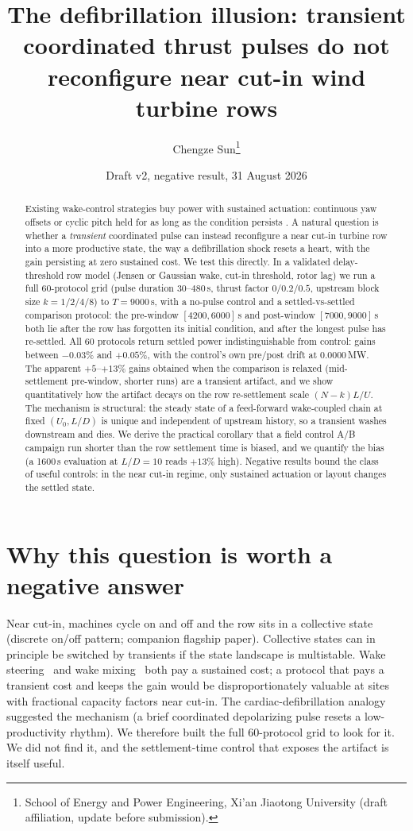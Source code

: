 \documentclass[11pt]{article}
\title{The defibrillation illusion: transient coordinated thrust pulses
do not reconfigure near cut-in wind turbine rows}
\author{Chengze Sun\thanks{School of Energy and Power Engineering, Xi'an Jiaotong University (draft affiliation, update before submission).}}
\date{Draft v2, negative result, 31 August 2026}
\begin{document}
\maketitle

\begin{abstract}
Existing wake-control strategies buy power with sustained actuation: continuous yaw offsets
or cyclic pitch held for as long as the condition persists
\cite{Howland2019,Korb2020,VanVondelen2024}. A natural question is whether a \emph{transient}
coordinated pulse can instead reconfigure a near cut-in turbine row into a more productive
state, the way a defibrillation shock resets a heart, with the gain persisting at zero
sustained cost. We test this directly. In a validated delay-threshold row model (Jensen or
Gaussian wake, cut-in threshold, rotor lag) we run a full 60-protocol grid (pulse duration
$30$--$480$\,s, thrust factor $0/0.2/0.5$, upstream block size $k=1/2/4/8$) to $T=9000$\,s,
with a no-pulse control and a settled-vs-settled comparison protocol: the pre-window
$[4200,6000]$\,s and post-window $[7000,9000]$\,s both lie after the row has forgotten its
initial condition, and after the longest pulse has re-settled. All 60 protocols return
settled power indistinguishable from control: gains between $-0.03\%$ and $+0.05\%$, with
the control's own pre/post drift at $0.0000$\,MW. The apparent $+5$--$+13\%$ gains obtained
when the comparison is relaxed (mid-settlement pre-window, shorter runs) are a transient
artifact, and we show quantitatively how the artifact decays on the row re-settlement scale
$(N-k)L/U$. The mechanism is structural: the steady state of a feed-forward wake-coupled
chain at fixed $(U_0, L/D)$ is unique and independent of upstream history, so a transient
washes downstream and dies. We derive the practical corollary that a field control A/B
campaign run shorter than the row settlement time is biased, and we quantify the bias
(a 1600\,s evaluation at $L/D=10$ reads $+13\%$ high). Negative results bound the class of
useful controls: in the near cut-in regime, only sustained actuation or layout changes the
settled state.
\end{abstract}

\section{Why this question is worth a negative answer}

Near cut-in, machines cycle on and off and the row sits in a collective state (discrete
on/off pattern; companion flagship paper). Collective states can in principle be switched by
transients if the state landscape is multistable. Wake steering~\cite{Howland2019} and wake
mixing~\cite{Korb2020,VanVondelen2024} both pay a sustained cost; a protocol that pays a
transient cost and keeps the gain would be disproportionately valuable at sites with
fractional capacity factors near cut-in. The cardiac-defibrillation analogy suggested the
mechanism (a brief coordinated depolarizing pulse resets a low-productivity rhythm). We
therefore built the full 60-protocol grid to look for it. We did not find it, and the
settlement-time control that exposes the artifact is itself useful.
\end{document}
